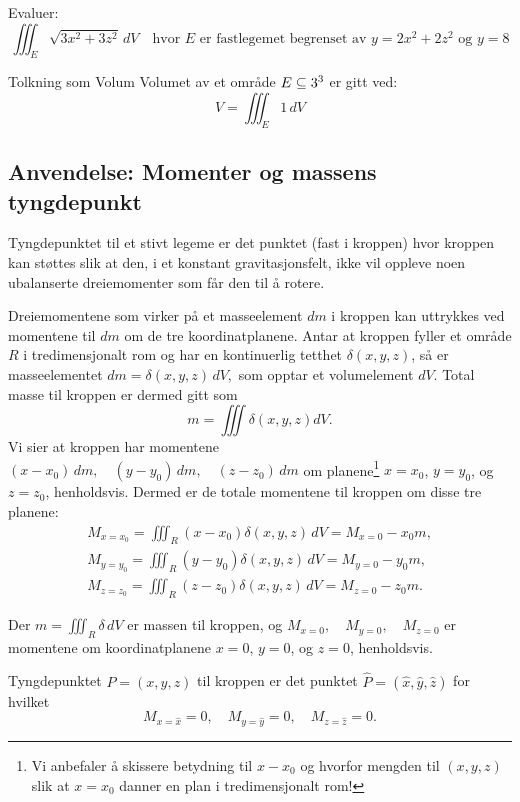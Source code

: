 \begin{eks}{}
Evaluer:
\[
\iiint_E \sqrt{3x^2 + 3z^2}\, dV \quad \text{hvor } E \text{ er fastlegemet begrenset av } y = 2x^2 + 2z^2 \text{ og } y = 8
\]
\end{eks}

\begin{rem}{Tolkning som Volum} Volumet av et område $E \subseteq 3^3$ er gitt ved:
\[
V = \iiint_E 1\, dV
\]
\end{rem}

\subsection*{Anvendelse: Momenter og massens tyngdepunkt}

Tyngdepunktet til et stivt legeme er det punktet (fast i kroppen) hvor kroppen kan støttes slik at den, i et konstant gravitasjonsfelt, ikke vil oppleve noen ubalanserte dreiemomenter som får den til å rotere.

Dreiemomentene som virker på et masseelement \( dm \) i kroppen kan uttrykkes ved momentene til \( dm \) om de tre koordinatplanene. Antar at kroppen fyller et område \( R \) i tredimensjonalt rom og har en kontinuerlig tetthet \( \delta(x, y, z) \), så er masseelementet
$
dm = \delta(x, y, z) \, dV,
$
som opptar et volumelement \( dV \). Total masse til kroppen er dermed gitt som 
\[m=\iiint \delta(x,y,z) dV.\]
Vi sier at kroppen har momentene
$(x - x_0) \, dm, \quad (y - y_0) \, dm, \quad (z - z_0) \, dm
$ om planene\footnote{Vi anbefaler å skissere betydning til $x-x_0$ og hvorfor mengden til $(x,y,z)$ slik at $x=x_0$ danner en plan i tredimensjonalt rom!} \( x = x_0 \), \( y = y_0 \), og \( z = z_0 \), henholdsvis.
Dermed er de totale momentene til kroppen om disse tre planene:
\begin{align*}
M_{x=x_0} =\iiint_R (x - x_0)\delta(x, y, z)\,dV = M_{x=0} - x_0 m,\\
M_{y=y_0} =\iiint_R (y - y_0)\delta(x, y, z)\,dV = M_{y=0} - y_0 m,\\
M_{z=z_0} =\iiint_R (z - z_0)\delta(x, y, z)\,dV = M_{z=0} - z_0 m.
\end{align*}

Der $m = \iiint_R \delta\, dV$ er massen til kroppen, og $M_{x = 0}, \quad M_{y = 0}, \quad M_{z = 0}$ er momentene om koordinatplanene \( x = 0 \), \( y = 0 \), og \( z = 0 \), henholdsvis.

Tyngdepunktet \( P = (x, y, z) \) til kroppen er det punktet $\hat{P} = (\hat{x},\hat{y},\hat{z})$ for hvilket
\[
M_{x=\hat{x}} = 0, \quad M_{y=\hat{y}} = 0, \quad M_{z=\hat{z}} = 0.
\]

